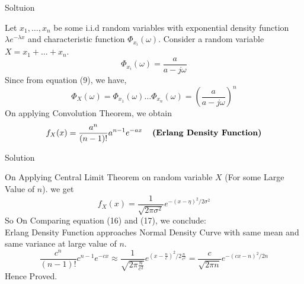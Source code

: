 \documentclass{beamer}
\begin{document}
\begin{frame}{Soltuion}
    \begin{block}{}
        Let $x_1,\ldots,x_n$ be some i.i.d random variables with exponential density function $\lambda e^{-\lambda x}$ and characteristic function $\Phi_{x_i}(\omega)$. Consider a random variable $X = x_1+\ldots+x_n$.
        \begin{equation}
            \Phi_{x_i}(\omega) = \frac{a}{a-j\omega}
        \end{equation}
        Since from equation (9), we have,
        \begin{equation}
            \Phi_X(\omega) = \Phi_{x_1}(\omega)\ldots \Phi_{x_n}(\omega) = \left(\frac{a}{a-j\omega}\right)^n
        \end{equation}
        On applying Convolution Theorem, we obtain
        \begin{equation}
            f_X(x) = \frac{a^n}{(n-1)!}a^{n-1}e^{-ax} \hspace*{12pt} \textbf{(Erlang Density Function)}
        \end{equation}
    \end{block}
\end{frame}
\begin{frame}{Solution}
    \begin{block}{}
        On Applying Central Limit Theorem on random variable $X$ (For some Large Value of $n$). we get
        \begin{equation}
            f_X(x) = \frac{1}{\sqrt{2\pi \sigma^2}}e^{-(x-\eta)^2/2\sigma^2}
        \end{equation}
        So On Comparing equation (16) and (17), we conclude:\\
        Erlang Density Function approaches Normal Density Curve with same mean and same variance at large value of $n$.
        \begin{equation}
           \frac{c^n}{(n-1)!}c^{n-1}e^{-cx} \approx \frac{1}{\sqrt{2\pi \frac{n}{c^2}}}e^{(x-\frac{n}{c})^2/2\frac{n}{c^2}} =\frac{c}{\sqrt{2\pi n}}e^{-(cx-n)^2/2n} 
        \end{equation}
        Hence Proved.
    \end{block}
\end{frame}
\end{document}
